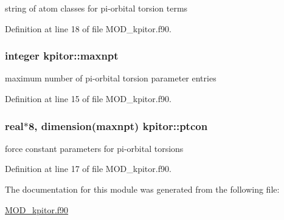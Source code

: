 string of atom classes for pi-\/orbital torsion terms 



Definition at line 18 of file M\-O\-D\-\_\-kpitor.\-f90.

\hypertarget{classkpitor_aee3241cd9ad325101f960cab1e5f7916}{
\subsubsection[{maxnpt}]{\setlength{\rightskip}{0pt plus 5cm}integer kpitor\-::maxnpt}}\label{classkpitor_aee3241cd9ad325101f960cab1e5f7916}


maximum number of pi-\/orbital torsion parameter entries 



Definition at line 15 of file M\-O\-D\-\_\-kpitor.\-f90.

\hypertarget{classkpitor_a95b760204df7792e9092a10acba281eb}{
\subsubsection[{ptcon}]{\setlength{\rightskip}{0pt plus 5cm}real$\ast$8, dimension({\bf maxnpt}) kpitor\-::ptcon}}\label{classkpitor_a95b760204df7792e9092a10acba281eb}


force constant parameters for pi-\/orbital torsions 



Definition at line 17 of file M\-O\-D\-\_\-kpitor.\-f90.



The documentation for this module was generated from the following file\-:\begin{DoxyCompactItemize}
\item 
\hyperlink{MOD__kpitor_8f90}{M\-O\-D\-\_\-kpitor.\-f90}\end{DoxyCompactItemize}
